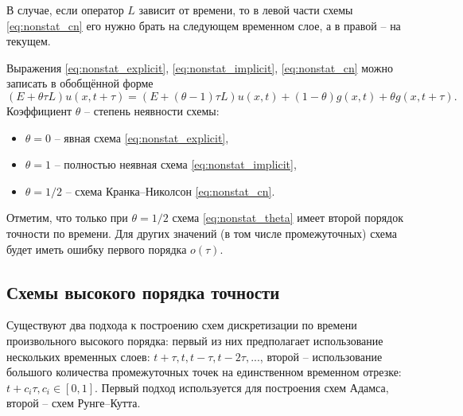 В случае, если оператор $L$ зависит от времени, то
в левой части схемы \eqref{eq:nonstat_cn} его нужно
брать на следующем временном слое, а в правой -- на текущем.


Выражения
\eqref{eq:nonstat_explicit},
\eqref{eq:nonstat_implicit},
\eqref{eq:nonstat_cn}
можно записать в обобщённой форме
\begin{equation}
    \label{eq:nonstat_theta}
    \left(E+\theta\tau L\right) u(x, t+\tau) = \left(E + \left(\theta - 1\right)\tau L\right) u(x, t) + \left(1 - \theta\right) g(x, t) + \theta g(x, t + \tau).
\end{equation}
Коэффициент $\theta$ -- степень неявности схемы:
\begin{itemize}
\item $\theta = 0$ -- явная схема \eqref{eq:nonstat_explicit},
\item $\theta = 1$ -- полностью неявная схема \eqref{eq:nonstat_implicit},
\item $\theta = 1/2$ -- схема Кранка--Николсон \eqref{eq:nonstat_cn}.
\end{itemize}

Отметим, что только при $\theta = 1/2$ схема \eqref{eq:nonstat_theta} имеет второй порядок точности по времени.
Для других значений (в том числе промежуточных) схема будет иметь ошибку первого порядка $o(\tau)$.

\subsection{Схемы высокого порядка точности}
Существуют два подхода к построению схем дискретизации по времени произвольного высокого порядка:
первый из них предполагает использование нескольких временных слоев: $t+\tau, t, t-\tau, t-2\tau, ...$, второй -- использование
большого количества промежуточных точек на единственном временном отрезке: $t+c_i\tau, c_i\in[0, 1]$.
Первый подход используется для построения схем Адамса, второй -- схем Рунге--Кутта.

